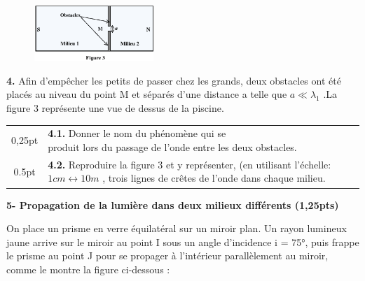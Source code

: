 \documentclass[12pt]{article}
\begin{document}
  \vspace{0.4cm}

\begin{figure}
  \begin{center}
	  \vspace{-1.6cm}
	\includegraphics[width=0.4\textwidth]{./img/onde_03.png}
  \end{center}
\end{figure}


\textbf{4. }Afin d’empêcher les petits de passer chez les grands, deux obstacles ont été placés au niveau du point M et séparés d’une distance a telle que $a \ll \lambda_1$ .La figure 3 représente une vue de dessus de la piscine.



\begin{tabular}{c|l}

0,25pt  & \makecell[l]{\textbf{4.1. }  Donner le nom du phénomène qui se \\produit lors
du passage de l’onde entre les deux obstacles.}\\

 0.5pt& \makecell[l]{\textbf{4.2. }  Reproduire la figure 3 et y représenter, \\(en utilisant l’échelle: $1cm \leftrightarrow 10m$ , trois lignes de crêtes de
l’onde dans chaque milieu.}\\

	\end{tabular}


  \vspace{0.3cm}
\hspace{-1cm}\textbf{5- Propagation de la lumière dans deux milieux différents  \dotfill(1,25pts)}

On place un prisme en verre équilatéral sur un miroir plan. Un rayon lumineux jaune arrive sur le miroir au point I sous un angle d'incidence i = 75°, puis frappe le prisme au point J pour se propager à l'intérieur parallèlement au miroir, comme le montre la figure ci-dessous :
\end{document}

